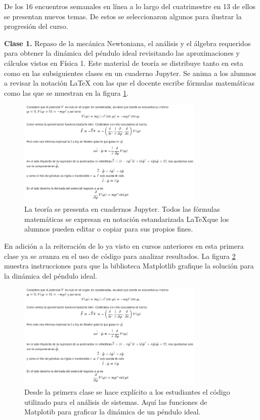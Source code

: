 De los 16 encuentros semanales en línea a lo largo del cuatrimestre en 13 de ellos se presentan nuevos temas. De estos se seleccionaron algunos para ilustrar la progresión del curso.

\textbf{Clase 1.} Repaso de la mecánica Newtoniana, el análisis y el álgebra requeridos para obtener la dinámica del péndulo ideal revisitando las aproximaciones y cálculos vistos en Física 1. Este material de teoría se distribuye tanto en esta como en las subsiguientes clases en un cuaderno Jupyter. Se anima a los alumnos a revisar la notación LaTeX con las que el docente escribe fórmulas matemáticas como las que se muestran en la figura \ref{fig:clase1pendulo}. 

\begin{figure}[!ht]
\centering
\includegraphics[width=3.5in]{figuras/clase1péndulo.png}
\caption{La teoría se presenta en cuadernos Jupyter. Todos las fórmulas matemáticas se expresan en notación estandarizada \LaTeX que los alumnos pueden editar o copiar para sus propios fines.}
\label{fig:clase1pendulo}
\end{figure}

En adición a la reiteración de lo ya visto en cursos anteriores en esta primera clase ya se avanza en el uso de código para analizar resultados. La figura \ref{fig:clase1graficos} muestra instrucciones para que la biblioteca Matplotlib grafique la solución para la dinámica del péndulo ideal.

\begin{figure}[!ht]
\centering
\includegraphics[width=3.5in]{figuras/clase1péndulo.png}
\caption{Desde la primera clase se hace explícito a los estudiantes el código utilizado para el análisis de sistemas. Aquí las funciones de Matplotib para graficar la dinámica de un péndulo ideal.}
\label{fig:clase1graficos}
\end{figure}

